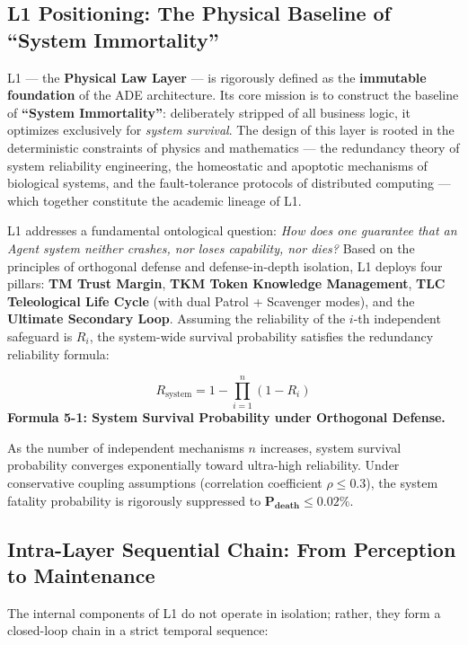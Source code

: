 \documentclass[11pt,a4paper]{article}
\begin{document}
\subsection{L1 Positioning: The Physical Baseline of ``System Immortality''}

L1 --- the \textbf{Physical Law Layer} --- is rigorously defined as the \textbf{immutable foundation} of the ADE architecture. Its core mission is to construct the baseline of \textbf{``System Immortality''}: deliberately stripped of all business logic, it optimizes exclusively for \emph{system survival}. The design of this layer is rooted in the deterministic constraints of physics and mathematics --- the redundancy theory of system reliability engineering, the homeostatic and apoptotic mechanisms of biological systems, and the fault-tolerance protocols of distributed computing --- which together constitute the academic lineage of L1.

L1 addresses a fundamental ontological question: \emph{How does one guarantee that an Agent system neither crashes, nor loses capability, nor dies?} Based on the principles of orthogonal defense and defense-in-depth isolation, L1 deploys four pillars: \textbf{TM Trust Margin}, \textbf{TKM Token Knowledge Management}, \textbf{TLC Teleological Life Cycle} (with dual Patrol + Scavenger modes), and the \textbf{Ultimate Secondary Loop}. Assuming the reliability of the $i$-th independent safeguard is $R_i$, the system-wide survival probability satisfies the redundancy reliability formula:

\begin{equation}\label{eq:sys-survival}
R_{\text{system}} = 1 - \prod_{i=1}^{n} (1 - R_i)
\end{equation}
\smallskip
\noindent\textbf{Formula 5-1: System Survival Probability under Orthogonal Defense.}

As the number of independent mechanisms $n$ increases, system survival probability converges exponentially toward ultra-high reliability. Under conservative coupling assumptions (correlation coefficient $\rho \leq 0.3$), the system fatality probability is rigorously suppressed to $\mathbf{P_{\text{death}} \leq 0.02\%}$.

\subsection{Intra-Layer Sequential Chain: From Perception to Maintenance}

The internal components of L1 do not operate in isolation; rather, they form a closed-loop chain in a strict temporal sequence:
\end{document}
